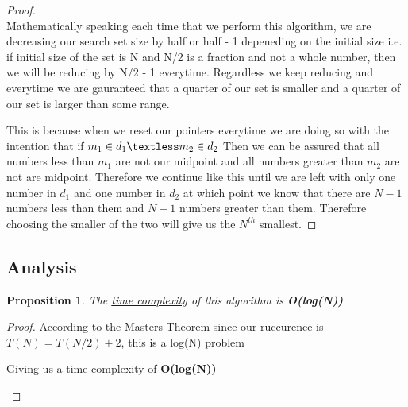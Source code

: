 \documentclass[12pt]{article}
\newtheorem{proposition}[theorem]{Proposition}
\begin{document}
\begin{proof}
~ \\ \indent Mathematically speaking each time that we perform this algorithm, we are decreasing our search set
size by half or half - 1 depeneding on the initial size i.e. if initial size of the set is N and N/2 is a fraction
and not a whole number, then we will be reducing by N/2 - 1 everytime. Regardless we keep reducing and everytime
we are gauranteed that a quarter of our set is smaller and a quarter of our set is larger than some range.

This is because when we reset our pointers everytime we are doing so with the intention
that if $m_1 \in d_1 \textless m_2 \in d_2$ Then we can be assured that all numbers less than $m_1$
are not our midpoint and all numbers greater than $m_2$ are not are midpoint. Therefore we continue like
this until we are left with only one number in $d_1$ and one number in $d_2$  at which point we know that
there are $N-1$ numbers less than them and $N-1$ numbers greater than them. Therefore choosing the smaller
of the two will give us the $N^{th}$ smallest.
\end{proof}


\subsection{Analysis}

\begin{proposition}
\label{numq}
The \underline{time complexity} of this algorithm is \textbf{O(log(N))}
\end{proposition}

\begin{proof}
According to the Masters Theorem since our ruccurence is $T(N) = T(N/2) + 2$, this is a log(N) problem
\begin{center}
    Giving us a time complexity of \textbf{O(log(N))}
\end{center}
\end{proof}

\end{document}
